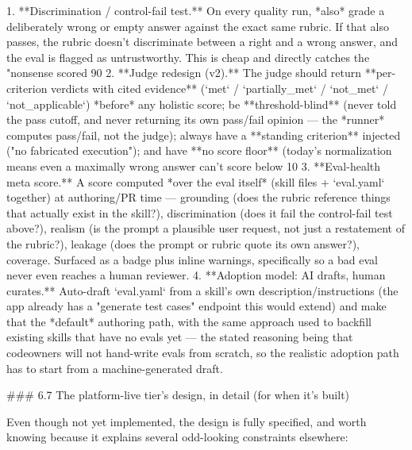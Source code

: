 1. **Discrimination / control-fail test.** On every quality run, *also* grade a deliberately wrong or empty answer against the exact same rubric. If that also passes, the rubric doesn't discriminate between a right and a wrong answer, and the eval is flagged as untrustworthy. This is cheap and directly catches the "nonsense scored 90%
2. **Judge redesign (v2).** The judge should return **per-criterion verdicts with cited evidence** (`met` / `partially_met` / `not_met` / `not_applicable`) *before* any holistic score; be **threshold-blind** (never told the pass cutoff, and never returning its own pass/fail opinion — the *runner* computes pass/fail, not the judge); always have a **standing criterion** injected ("no fabricated execution"); and have **no score floor** (today's normalization means even a maximally wrong answer can't score below 10%
3. **Eval-health meta score.** A score computed *over the eval itself* (skill files + `eval.yaml` together) at authoring/PR time — grounding (does the rubric reference things that actually exist in the skill?), discrimination (does it fail the control-fail test above?), realism (is the prompt a plausible user request, not just a restatement of the rubric?), leakage (does the prompt or rubric quote its own answer?), coverage. Surfaced as a badge plus inline warnings, specifically so a bad eval never even reaches a human reviewer.
4. **Adoption model: AI drafts, human curates.** Auto-draft `eval.yaml` from a skill's own description/instructions (the app already has a "generate test cases" endpoint this would extend) and make that the *default* authoring path, with the same approach used to backfill existing skills that have no evals yet — the stated reasoning being that codeowners will not hand-write evals from scratch, so the realistic adoption path has to start from a machine-generated draft.

### 6.7 The platform-live tier's design, in detail (for when it's built)

Even though not yet implemented, the design is fully specified, and worth knowing because it explains several odd-looking constraints elsewhere:

